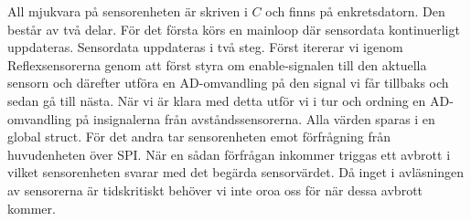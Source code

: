 All mjukvara på sensorenheten är skriven i $C$ och finns på enkretsdatorn. Den består av två delar.
\newline
För det första körs en mainloop där sensordata kontinuerligt uppdateras. Sensordata uppdateras i två steg. Först itererar vi igenom Reflexsensorerna genom att först styra om enable-signalen till den aktuella sensorn och därefter utföra en AD-omvandling på den signal vi får tillbaks och sedan gå till nästa. När vi är klara med detta utför vi i tur och ordning en AD-omvandling på insignalerna från avståndssensorerna. Alla värden sparas i en global struct.
\newline
För det andra tar sensorenheten emot förfrågning från huvudenheten över SPI. När en sådan förfrågan inkommer triggas ett avbrott i vilket sensorenheten svarar med det begärda sensorvärdet. Då inget i avläsningen av sensorerna är tidskritiskt behöver vi inte oroa oss för när dessa avbrott kommer.
